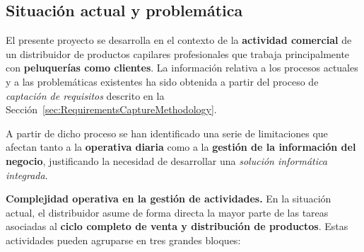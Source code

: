 \subsection{Situación actual y problemática}

El presente proyecto se desarrolla en el contexto de la \textbf{actividad comercial} de un distribuidor de productos capilares profesionales que trabaja principalmente con \textbf{peluquerías como clientes}. La información relativa a los procesos actuales y a las problemáticas existentes ha sido obtenida a partir del proceso de \textit{captación de requisitos} descrito en la Sección~\ref{sec:RequirementsCaptureMethodology}.

A partir de dicho proceso se han identificado una serie de limitaciones que afectan tanto a la \textbf{operativa diaria} como a la \textbf{gestión de la información del negocio}, justificando la necesidad de desarrollar una \textit{solución informática integrada}.

\noindent\textbf{Complejidad operativa en la gestión de actividades.} En la situación actual, el distribuidor asume de forma directa la mayor parte de las tareas asociadas al \textbf{ciclo completo de venta y distribución de productos}. Estas actividades pueden agruparse en tres grandes bloques:

